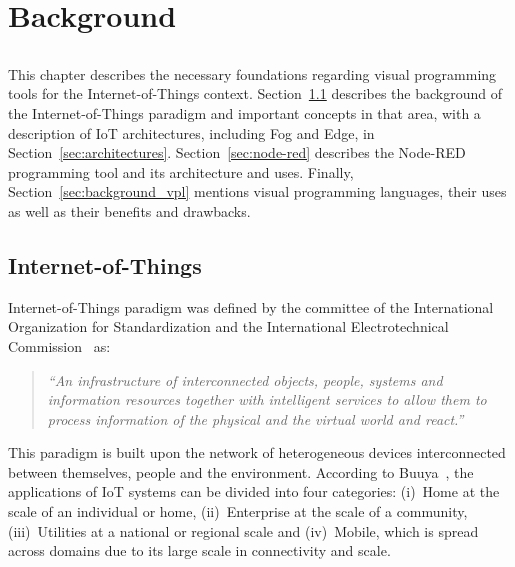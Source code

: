 \chapter{Background} \label{chap:background} \minitoc

\section*{}


This chapter describes the necessary foundations regarding visual programming tools for the Internet-of-Things context. Section~\ref{sec:background_iot} describes the background of the Internet-of-Things paradigm and important concepts in that area, with a description of IoT architectures, including Fog and Edge, in Section~\ref{sec:architectures}. Section~\ref{sec:node-red} describes the Node-RED programming tool and its architecture and uses. Finally, Section~\ref{sec:background_vpl} mentions visual programming languages, their uses as well as their benefits and drawbacks.

\section{Internet-of-Things}\label{sec:background_iot}

Internet-of-Things paradigm was defined by the committee of the International Organization for Standardization and the International Electrotechnical Commission~\cite{ISOIEC} as:
\begin{quote}
    \emph{“An infrastructure of interconnected objects, people, systems and information resources together with intelligent services to allow them to process information of the physical and the virtual world and react.”}
\end{quote}

This paradigm is built upon the network of heterogeneous devices interconnected between themselves, people and the environment. According to Buuya~\cite{iot_future_direction}, the applications of IoT systems can be divided into four categories: (i)~Home at the scale of an individual or home, (ii)~Enterprise at the scale of a community, (iii)~Utilities at a national or regional scale and (iv)~Mobile, which is spread across domains due to its large scale in connectivity and scale. 

